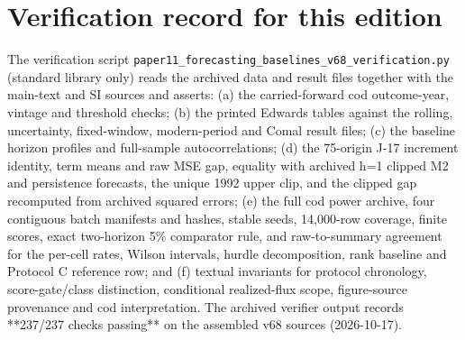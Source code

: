 \begin{table}[!htb]
\centering\small
\caption{Lag-one autocorrelations (autocovariance estimator), means and standard deviations of the series used in main-text Section~5.1. Units: ft and $10^3$ acre-ft for J-17; kt for cod.}
\label{tab:si_autocorr}

\end{table}

\section{Verification record for this edition}\label{si:verify}

The verification script \texttt{paper11\_forecasting\_\allowbreak{}baselines\_v68\_\allowbreak{}verification.py} (standard library only) reads the archived data and result files together with the main-text and SI sources and asserts: (a) the carried-forward cod outcome-year, vintage and threshold checks; (b) the printed Edwards tables against the rolling, uncertainty, fixed-window, modern-period and Comal result files; (c) the baseline horizon profiles and full-sample autocorrelations; (d) the 75-origin J-17 increment identity, term means and raw MSE gap, equality with archived h=1 clipped M2 and persistence forecasts, the unique 1992 upper clip, and the clipped gap recomputed from archived squared errors; (e) the full cod power archive, four contiguous batch manifests and hashes, stable seeds, 14,000-row coverage, finite scores, exact two-horizon 5\% comparator rule, and raw-to-summary agreement for the per-cell rates, Wilson intervals, hurdle decomposition, rank baseline and Protocol C reference row; and (f) textual invariants for protocol chronology, score-gate/class distinction, conditional realized-flux scope, figure-source provenance and cod interpretation. The archived verifier output records **237/237 checks passing** on the assembled v68 sources (2026-10-17).


